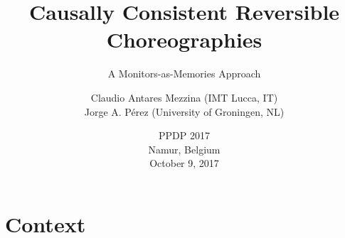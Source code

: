 \documentclass[12pt]{beamer}
\title[Reversible Choreographies]{Causally Consistent Reversible Choreographies}
\subtitle{A Monitors-as-Memories Approach}
\author[Mezzina \& P\'{e}rez]{Claudio Antares Mezzina (IMT Lucca, IT)\\ 	
Jorge A. P\'{e}rez  (University of Groningen, NL)}
\date[October 9, 2017]
{
PPDP 2017\\ Namur, Belgium
\\
October 9, 2017
}
\begin{document}
%
%
%


\begin{frame}

\begin{center}
\maketitle
\end{center}

\end{frame}

\section{Context}
\end{document}
